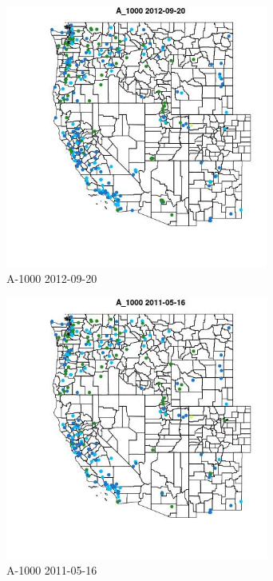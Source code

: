 \begin{figure} 
\centering  
\includegraphics[width=0.77\textwidth]{Code_Outputs/ML_input_report_ML_input_PM25_Step5_part_d_de_duplicated_aves_ML_input_MapObsA_10002012-09-20.jpg} 
\caption{\label{fig:ML_input_report_ML_input_PM25_Step5_part_d_de_duplicated_aves_ML_inputMapObsA_10002012-09-20}A-1000 2012-09-20} 
\end{figure} 
 

\begin{figure} 
\centering  
\includegraphics[width=0.77\textwidth]{Code_Outputs/ML_input_report_ML_input_PM25_Step5_part_d_de_duplicated_aves_ML_input_MapObsA_10002011-05-16.jpg} 
\caption{\label{fig:ML_input_report_ML_input_PM25_Step5_part_d_de_duplicated_aves_ML_inputMapObsA_10002011-05-16}A-1000 2011-05-16} 
\end{figure} 
 

